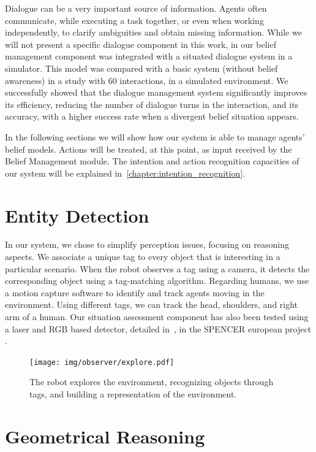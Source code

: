 Dialogue can be a very important source of information. Agents often communicate, while executing a task together, or even when working independently, to clarify ambiguities and obtain missing information. While we will not present a specific dialogue component in this work,  in \cite{Ferreira2015} our belief management component was integrated with a situated dialogue system in a simulator. This model was compared with a basic system (without belief awareness) in a study with 60 interactions, in a simulated environment. We successfully showed that the dialogue management system significantly improves its efficiency, reducing the number of dialogue turns in the interaction, and its accuracy, with a higher success rate when a divergent belief situation appears.

In the following sections we will show how our system is able to manage agents' belief models. Actions will be treated, at this point, as input received by the Belief Management module. The intention and action recognition capacities of our system will be explained in~\ref{chapter:intention_recognition}. 

\section{Entity Detection}
\label{sec:belief_management-entity_detection}
In our system, we chose to simplify perception issues, focusing on reasoning aspects. We associate a unique tag to every object that is interesting in a particular scenario. When the robot observes a tag using a camera, it detects the corresponding object using a tag-matching algorithm.
Regarding humans, we use a motion capture software to identify and track agents moving in the environment. Using different tags, we can track the head, shoulders, and right arm of a human. Our situation assessment component has also been tested using a laser and RGB based detector, detailed in~\cite{lindermulti}, in the SPENCER european project .

 \begin{figure}[ht!]
	\centering
	\texttt{[image: img/observer/explore.pdf]}
	\caption[The robot builds a representation of the environment]{The robot explores the environment, recognizing objects through tags, and building a representation of the environment.}
	\label{fig:belief_management-explore}
\end{figure}

\section{Geometrical Reasoning}
\label{sec:belief_management-geometrical_reasoning}

